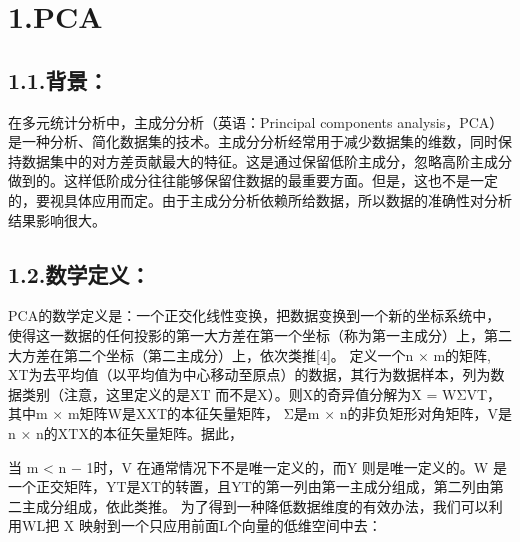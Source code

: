 \documentclass[a4paper, 12pt]{ctexart}
\begin{document}
\mdxtitleblockstart{}
\mdtitleauthorrunning{}{}\mdxtitleblockend%

\section{1.\hspace*{0.5em}PCA}\label{sec-pca}%

\subsection{1.1.\hspace*{0.5em}背景：}\label{section}%

\noindent{}在多元统计分析中，主成分分析（英语：Principal components analysis，PCA）是一种分析、简化数据集的技术。主成分分析经常用于减少数据集的维数，同时保持数据集中的对方差贡献最大的特征。这是通过保留低阶主成分，忽略高阶主成分做到的。这样低阶成分往往能够保留住数据的最重要方面。但是，这也不是一定的，要视具体应用而定。由于主成分分析依赖所给数据，所以数据的准确性对分析结果影响很大。%

\subsection{1.2.\hspace*{0.5em}数学定义：}\label{section}%

\noindent{}PCA的数学定义是：一个正交化线性变换，把数据变换到一个新的坐标系统中，使得这一数据的任何投影的第一大方差在第一个坐标（称为第一主成分）上，第二大方差在第二个坐标（第二主成分）上，依次类推[4]。
定义一个n × m的矩阵, XT为去平均值（以平均值为中心移动至原点）的数据，其行为数据样本，列为数据类别（注意，这里定义的是XT 而不是X）。则X的奇异值分解为X = WΣVT，其中m × m矩阵W是XXT的本征矢量矩阵， Σ是m × n的非负矩形对角矩阵，V是n × n的XTX的本征矢量矩阵。据此，%

当 m \textless{} n − 1时，V 在通常情况下不是唯一定义的，而Y 则是唯一定义的。W 是一个正交矩阵，YT是XT的转置，且YT的第一列由第一主成分组成，第二列由第二主成分组成，依此类推。
为了得到一种降低数据维度的有效办法，我们可以利用WL把 X 映射到一个只应用前面L个向量的低维空间中去：%
\end{document}
